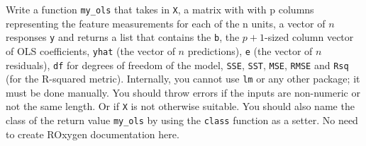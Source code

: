 \documentclass[
]{article}
\begin{document}
Write a function \texttt{my\_ols} that takes in \texttt{X}, a matrix
with with p columns representing the feature measurements for each of
the n units, a vector of \(n\) responses \texttt{y} and returns a list
that contains the \texttt{b}, the \(p+1\)-sized column vector of OLS
coefficients, \texttt{yhat} (the vector of \(n\) predictions),
\texttt{e} (the vector of \(n\) residuals), \texttt{df} for degrees of
freedom of the model, \texttt{SSE}, \texttt{SST}, \texttt{MSE},
\texttt{RMSE} and \texttt{Rsq} (for the R-squared metric). Internally,
you cannot use \texttt{lm} or any other package; it must be done
manually. You should throw errors if the inputs are non-numeric or not
the same length. Or if \texttt{X} is not otherwise suitable. You should
also name the class of the return value \texttt{my\_ols} by using the
\texttt{class} function as a setter. No need to create ROxygen
documentation here.
\end{document}
